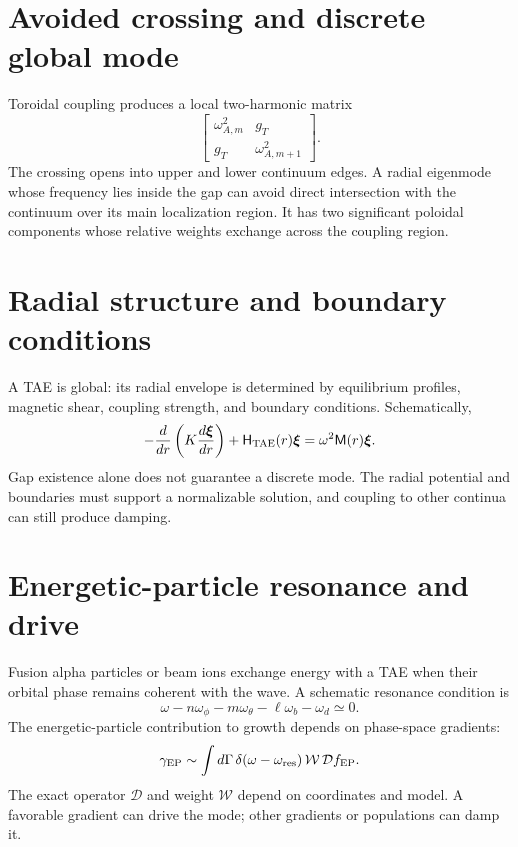 \documentclass[11pt]{article}
\begin{document}
\section{Avoided crossing and discrete global mode}

Toroidal coupling produces a local two-harmonic matrix
\begin{equation}
\begin{bmatrix}
\omega_{A,m}^2&g_T\\
g_T&\omega_{A,m+1}^2
\end{bmatrix}.
\end{equation}
The crossing opens into upper and lower continuum edges. A radial eigenmode whose frequency lies inside the gap can avoid direct intersection with the continuum over its main localization region. It has two significant poloidal components whose relative weights exchange across the coupling region.


\section{Radial structure and boundary conditions}

A TAE is global: its radial envelope is determined by equilibrium profiles, magnetic shear, coupling strength, and boundary conditions. Schematically,
\begin{equation}
-\frac{d}{dr}\left(K\frac{d\boldsymbol\xi}{dr}\right)
+\mathsf H_{\rm TAE}(r)\boldsymbol\xi
=\omega^2\mathsf M(r)\boldsymbol\xi.
\end{equation}
Gap existence alone does not guarantee a discrete mode. The radial potential and boundaries must support a normalizable solution, and coupling to other continua can still produce damping.


\section{Energetic-particle resonance and drive}

Fusion alpha particles or beam ions exchange energy with a TAE when their orbital phase remains coherent with the wave. A schematic resonance condition is
\begin{equation}
\omega-n\omega_\phi-m\omega_\theta-\ell\omega_b-\omega_d\simeq0.
\end{equation}
The energetic-particle contribution to growth depends on phase-space gradients:
\begin{equation}
\gamma_{\rm EP}\sim
\int d\Gamma\,\delta(\omega-\omega_{\rm res})
\,\mathcal W\,\mathcal D f_{\rm EP}.
\end{equation}
The exact operator $\mathcal D$ and weight $\mathcal W$ depend on coordinates and model. A favorable gradient can drive the mode; other gradients or populations can damp it.
\end{document}
